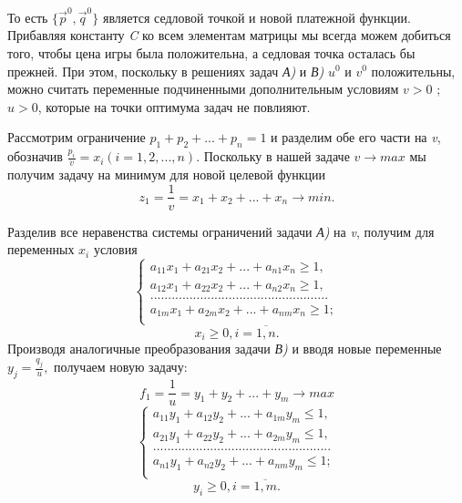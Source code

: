 То есть $\{{\vec{p}^0, \vec{q}^0}\}$ является седловой точкой и новой платежной функции. Прибавляя константу \emph{C} ко всем элементам матрицы мы всегда можем добиться того, чтобы цена игры была положительна, а седловая точка осталась бы прежней. При этом, поскольку в решениях задач \emph{А)} и \emph{В)} ${u^0}$ и ${v^0}$  положительны, можно считать переменные подчиненными дополнительным условиям ${v>0}$ ; ${u>0}$, которые на
точки оптимума задач не повлияют.

Рассмотрим ограничение $p_1+p_2+...+p_n=1$ и разделим обе его части на \emph{v}, обозначив $\frac{p_i}{v}=x_{i} (i=1,2,...,n).$ Поскольку в нашей задаче $v \to max$ мы получим задачу на минимум для новой целевой функции
\begin{equation}
\label{equation_4_36}
    z_1=\frac{1}{v}=x_1+x_2+...+x_n \to min.
\end{equation}

Разделив все  неравенства  системы  ограничений задачи \emph{А)} на \emph{v}, получим для переменных $x_i$ условия
\begin{equation}
\label{equation_4_37}
\left\{
\begin{array}{l}
a_{11}x_1+a_{21}x_2+...+a_{n1}x_n \geqslant 1,\\
a_{12}x_1+a_{22}x_2+...+a_{n2}x_n \geqslant 1,\\
..................................................\\
a_{1m}x_1+a_{2m}x_2+...+a_{nm}x_n \geqslant 1;\\
\end{array}
\right.
\end{equation}
\begin{equation}
\label{equation_4_38}
    x_i \geqslant 0, i=\overline{1,n}.
\end{equation}
Производя аналогичные преобразования задачи \emph{В)} и вводя новые переменные $y_j=\frac{q_j}{u},$ получаем новую задачу:
\begin{equation}
\label{equation_4_39}
    f_1=\frac{1}{u}=y_1+y_2+...+y_m \to max
\end{equation}
\begin{equation}
\label{equation_4_40}
\left\{
\begin{array}{l}
a_{11}y_1+a_{12}y_2+...+a_{1m}y_m \leqslant 1,\\
a_{21}y_1+a_{22}y_2+...+a_{2m}y_m \leqslant 1,\\
..................................................\\
a_{n1}y_1+a_{n2}y_2+...+a_{nm}y_m \leqslant 1;\\
\end{array}
\right.
\end{equation}
\begin{equation}
\label{equation_4_41}
    y_i \geqslant 0, i=\overline{1,m}.
\end{equation}

